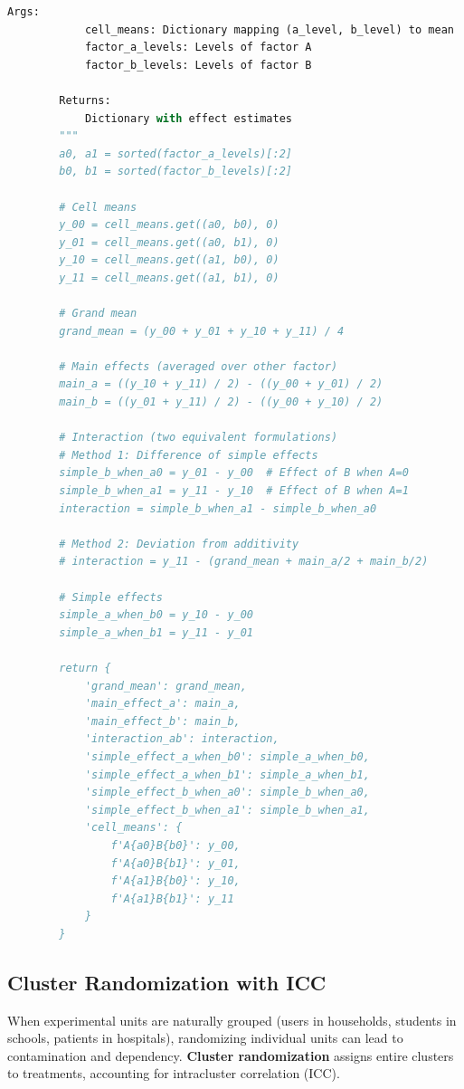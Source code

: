 \begin{lstlisting}[language=Python, caption={Comprehensive Factorial Design Framework}]
        Args:
            cell_means: Dictionary mapping (a_level, b_level) to mean
            factor_a_levels: Levels of factor A
            factor_b_levels: Levels of factor B

        Returns:
            Dictionary with effect estimates
        """
        a0, a1 = sorted(factor_a_levels)[:2]
        b0, b1 = sorted(factor_b_levels)[:2]

        # Cell means
        y_00 = cell_means.get((a0, b0), 0)
        y_01 = cell_means.get((a0, b1), 0)
        y_10 = cell_means.get((a1, b0), 0)
        y_11 = cell_means.get((a1, b1), 0)

        # Grand mean
        grand_mean = (y_00 + y_01 + y_10 + y_11) / 4

        # Main effects (averaged over other factor)
        main_a = ((y_10 + y_11) / 2) - ((y_00 + y_01) / 2)
        main_b = ((y_01 + y_11) / 2) - ((y_00 + y_10) / 2)

        # Interaction (two equivalent formulations)
        # Method 1: Difference of simple effects
        simple_b_when_a0 = y_01 - y_00  # Effect of B when A=0
        simple_b_when_a1 = y_11 - y_10  # Effect of B when A=1
        interaction = simple_b_when_a1 - simple_b_when_a0

        # Method 2: Deviation from additivity
        # interaction = y_11 - (grand_mean + main_a/2 + main_b/2)

        # Simple effects
        simple_a_when_b0 = y_10 - y_00
        simple_a_when_b1 = y_11 - y_01

        return {
            'grand_mean': grand_mean,
            'main_effect_a': main_a,
            'main_effect_b': main_b,
            'interaction_ab': interaction,
            'simple_effect_a_when_b0': simple_a_when_b0,
            'simple_effect_a_when_b1': simple_a_when_b1,
            'simple_effect_b_when_a0': simple_b_when_a0,
            'simple_effect_b_when_a1': simple_b_when_a1,
            'cell_means': {
                f'A{a0}B{b0}': y_00,
                f'A{a0}B{b1}': y_01,
                f'A{a1}B{b0}': y_10,
                f'A{a1}B{b1}': y_11
            }
        }
\end{lstlisting}

\subsection{Cluster Randomization with ICC}

When experimental units are naturally grouped (users in households, students in schools, patients in hospitals), randomizing individual units can lead to contamination and dependency. \textbf{Cluster randomization} assigns entire clusters to treatments, accounting for intracluster correlation (ICC).

